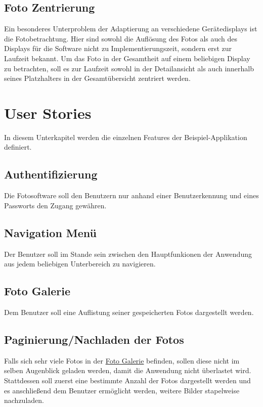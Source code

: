 \subsection{Foto Zentrierung}
\label{sec:spec:photo_centering}

Ein besonderes Unterproblem der Adaptierung an verschiedene Gerätedisplays ist die Fotobetrachtung. Hier sind sowohl die Auflösung des Fotos als auch des Displays für die Software nicht zu Implementierungszeit, sondern erst zur Laufzeit bekannt. Um das Foto in der Gesamtheit auf einem beliebigen Display zu betrachten, soll es zur Laufzeit sowohl in der Detailansicht als auch innerhalb seines Platzhalters in der Gesamtübersicht zentriert werden.

\section{User Stories}

In diesem Unterkapitel werden die einzelnen Features der Beispiel-Applikation definiert.

\subsection{Authentifizierung}
\label{sec:spec:authentication}

Die Fotosoftware soll den Benutzern nur anhand einer Benutzerkennung und eines Passworts den Zugang gewähren.

\subsection{Navigation Menü}
\label{sec:spec:menu}

Der Benutzer soll im Stande sein zwischen den Hauptfunkionen der Anwendung aus jedem beliebigen Unterbereich zu navigieren.

\subsection{Foto Galerie}
\label{sec:spec:photo_gallery}

Dem Benutzer soll eine Auflistung seiner gespeicherten Fotos dargestellt werden.

\subsection{Paginierung/Nachladen der Fotos}
\label{sec:spec:pagination}

Falls sich sehr viele Fotos in der \hyperref[sec:spec:photo_gallery]{Foto Galerie} befinden, sollen diese nicht im selben Augenblick geladen werden, damit die Anwendung nicht überlastet wird. Stattdessen soll zuerst eine bestimmte Anzahl der Fotos dargestellt werden und es anschließend dem Benutzer ermöglicht werden, weitere Bilder stapelweise nachzuladen.

